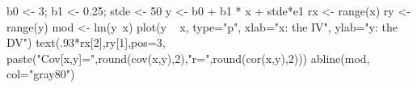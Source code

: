 \begin{Schunk}
\begin{Sinput}
 b0 <- 3; b1 <- 0.25; stde <- 50
 y <- b0 + b1 * x + stde*e1
 rx <- range(x)
 ry <- range(y)
 mod <- lm(y~x)
 plot(y ~ x, type="p", xlab="x: the IV", ylab="y: the DV")
 text(.93*rx[2],ry[1],pos=3, paste("Cov[x,y]=",round(cov(x,y),2),"\n r=",round(cor(x,y),2)))
 abline(mod, col="gray80")
\end{Sinput}
\end{Schunk}
